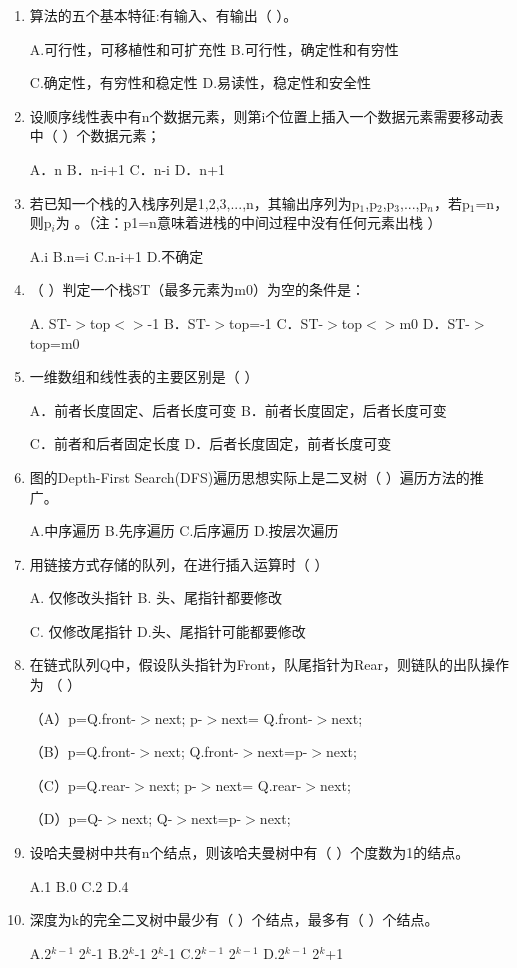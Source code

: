 \documentclass{../../note}
\begin{document}
\begin{enumerate}
\item 算法的五个基本特征:有输入、有输出（ ）。

A.可行性，可移植性和可扩充性 B.可行性，确定性和有穷性

C.确定性，有穷性和稳定性 D.易读性，稳定性和安全性

\item 设顺序线性表中有n个数据元素，则第i个位置上插入一个数据元素需要移动表中（ ）个数据元素；

A．n B．n-i+1 C．n-i D．n+1

\item 若已知一个栈的入栈序列是1,2,3,...,n，其输出序列为p$_1$,p$_2$,p$_3$,...,p$_n$，若p$_1$=n，则p$_i$为 。（注：p1=n意味着进栈的中间过程中没有任何元素出栈 ）

A.i B.n=i C.n-i+1 D.不确定

\item （ ）判定一个栈ST（最多元素为m0）为空的条件是：

A. ST-$>$top$<>$-1 B．ST-$>$top=-1 C．ST-$>$top$<>$m0 D．ST-$>$top=m0

\item 一维数组和线性表的主要区别是（ ）

A．前者长度固定、后者长度可变 B．前者长度固定，后者长度可变

C．前者和后者固定长度 D．后者长度固定，前者长度可变

\item 图的Depth-First Search(DFS)遍历思想实际上是二叉树（ ）遍历方法的推广。

A.中序遍历 B.先序遍历 C.后序遍历 D.按层次遍历

\item 用链接方式存储的队列，在进行插入运算时（ ）

A. 仅修改头指针 B. 头、尾指针都要修改

C. 仅修改尾指针 D.头、尾指针可能都要修改

\item 在链式队列Q中，假设队头指针为Front，队尾指针为Rear，则链队的出队操作为 （ ）

（A）p=Q.front-$>$next; p-$>$next= Q.front-$>$next;

（B）p=Q.front-$>$next; Q.front-$>$next=p-$>$next;

（C）p=Q.rear-$>$next; p-$>$next= Q.rear-$>$next;

（D）p=Q-$>$next; Q-$>$next=p-$>$next;

\item 设哈夫曼树中共有n个结点，则该哈夫曼树中有（ ）个度数为1的结点。

A.1 B.0 C.2 D.4

\item 深度为k的完全二叉树中最少有（ ）个结点，最多有（ ）个结点。

A.2$^{k-1}$ 2$^k$-1 B.2$^k$-1 2$^k$-1 C.2$^{k-1}$ 2$^{k-1}$ D.2$^{k-1}$ 2$^k$+1
\end{enumerate}
\end{document}
